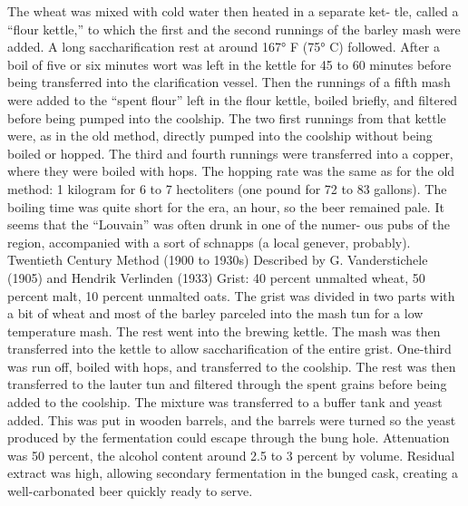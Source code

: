 \documentclass[a4paper,parskip=half]{scrartcl}
\begin{document}
The wheat was mixed with cold water then heated in a separate ket-
tle, called a “flour kettle,” to which the first and the second runnings of
the barley mash were added. A long saccharification rest at around 167°
F (75° C) followed. After a boil of five or six minutes wort was left in the
kettle for 45 to 60 minutes before being transferred into the clarification
vessel. Then the runnings of a fifth mash were added to the “spent flour”
left in the flour kettle, boiled briefly, and filtered before being pumped
into the coolship.
The two first runnings from that kettle were, as in the old method,
directly pumped into the coolship without being boiled or hopped.
The third and fourth runnings were transferred into a copper, where
they were boiled with hops. The hopping rate was the same as for the
old method: 1 kilogram for 6 to 7 hectoliters (one pound for 72 to 83
gallons). The boiling time was quite short for the era, an hour, so the
beer remained pale.
It seems that the “Louvain” was often drunk in one of the numer-
ous pubs of the region, accompanied with a sort of schnapps (a local
genever, probably).
Twentieth Century Method (1900 to 1930s)
Described by G. Vanderstichele (1905) and Hendrik Verlinden (1933)
Grist: 40 percent unmalted wheat, 50 percent malt, 10 percent unmalted
oats.
The grist was divided in two parts with a bit of wheat and most of
the barley parceled into the mash tun for a low temperature mash. The
rest went into the brewing kettle. The mash was then transferred into
the kettle to allow saccharification of the entire grist.
One-third was run off, boiled with hops, and transferred to the
coolship. The rest was then transferred to the lauter tun and filtered
through the spent grains before being added to the coolship. The
mixture was transferred to a buffer tank and yeast added. This was
put in wooden barrels, and the barrels were turned so the yeast
produced by the fermentation could escape through the bung hole.
Attenuation was 50 percent, the alcohol content around 2.5 to 3
percent by volume. Residual extract was high, allowing secondary
fermentation in the bunged cask, creating a well-carbonated beer
quickly ready to serve.

\parencite[44]{Hieronymus2010}
\end{document}
